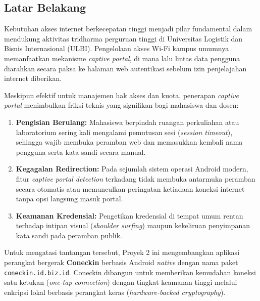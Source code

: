 \subsection{Latar Belakang}
Kebutuhan akses internet berkecepatan tinggi menjadi pilar fundamental dalam mendukung aktivitas tridharma perguruan tinggi di Universitas Logistik dan Bisnis Internasional (ULBI). Pengelolaan akses Wi-Fi kampus umumnya memanfaatkan mekanisme \textit{captive portal}, di mana lalu lintas data pengguna diarahkan secara paksa ke halaman web autentikasi sebelum izin penjelajahan internet diberikan.

Meskipun efektif untuk manajemen hak akses dan kuota, penerapan \textit{captive portal} menimbulkan friksi teknis yang signifikan bagi mahasiswa dan dosen:
\begin{enumerate}
    \item \textbf{Pengisian Berulang:} Mahasiswa berpindah ruangan perkuliahan atau laboratorium sering kali mengalami pemutusan sesi (\textit{session timeout}), sehingga wajib membuka peramban web dan memasukkan kembali nama pengguna serta kata sandi secara manual.
    \item \textbf{Kegagalan Redirection:} Pada sejumlah sistem operasi Android modern, fitur \textit{captive portal detection} terkadang tidak membuka antarmuka peramban secara otomatis atau memunculkan peringatan ketiadaan koneksi internet tanpa opsi langsung masuk portal.
    \item \textbf{Keamanan Kredensial:} Pengetikan kredensial di tempat umum rentan terhadap intipan visual (\textit{shoulder surfing}) maupun kekeliruan penyimpanan kata sandi pada peramban publik.
\end{enumerate}

Untuk mengatasi tantangan tersebut, Proyek 2 ini mengembangkan aplikasi perangkat bergerak \textbf{Coneckin} berbasis Android \textit{native} dengan nama paket \texttt{coneckin.id.biz.id}. Coneckin dibangun untuk memberikan kemudahan koneksi satu ketukan (\textit{one-tap connection}) dengan tingkat keamanan tinggi melalui enkripsi lokal berbasis perangkat keras (\textit{hardware-backed cryptography}).

